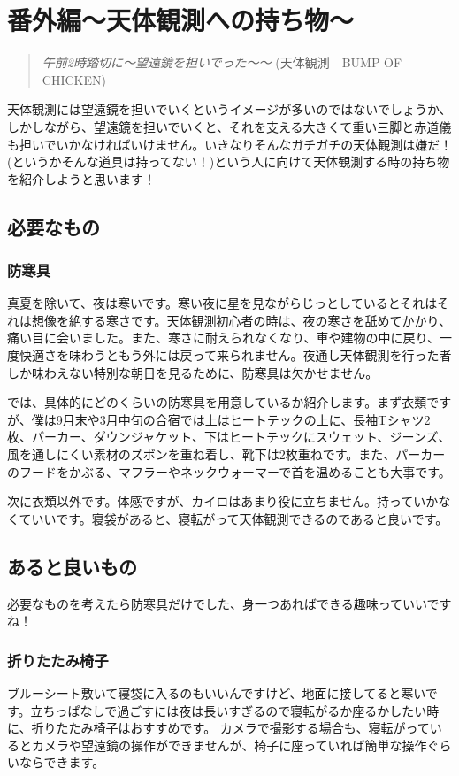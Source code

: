 \documentclass[../main]{subfiles}
\begin{document}
\section{番外編〜天体観測への持ち物〜}
\begin{verse}
  {\slshape
  午前2時踏切に〜望遠鏡を担いでった〜〜
  }
  (天体観測　BUMP OF CHICKEN)
\end{verse}



天体観測には望遠鏡を担いでいくというイメージが多いのではないでしょうか、しかしながら、望遠鏡を担いでいくと、それを支える大きくて重い三脚と赤道儀も担いでいかなければいけません。いきなりそんなガチガチの天体観測は嫌だ！(というかそんな道具は持ってない！)という人に向けて天体観測する時の持ち物を紹介しようと思います！

\subsection{必要なもの}
\subsubsection{防寒具}
真夏を除いて、夜は寒いです。寒い夜に星を見ながらじっとしているとそれはそれは想像を絶する寒さです。天体観測初心者の時は、夜の寒さを舐めてかかり、痛い目に会いました。また、寒さに耐えられなくなり、車や建物の中に戻り、一度快適さを味わうともう外には戻って来られません。夜通し天体観測を行った者しか味わえない特別な朝日を見るために、防寒具は欠かせません。

では、具体的にどのくらいの防寒具を用意しているか紹介します。まず衣類ですが、僕は9月末や3月中旬の合宿では上はヒートテックの上に、長袖Tシャツ2枚、パーカー、ダウンジャケット、下はヒートテックにスウェット、ジーンズ、風を通しにくい素材のズボンを重ね着し、靴下は2枚重ねです。また、パーカーのフードをかぶる、マフラーやネックウォーマーで首を温めることも大事です。

次に衣類以外です。体感ですが、カイロはあまり役に立ちません。持っていかなくていいです。寝袋があると、寝転がって天体観測できるのであると良いです。

\subsection{あると良いもの}
必要なものを考えたら防寒具だけでした、身一つあればできる趣味っていいですね！

\subsubsection{折りたたみ椅子}
ブルーシート敷いて寝袋に入るのもいいんですけど、地面に接してると寒いです。立ちっぱなしで過ごすには夜は長いすぎるので寝転がるか座るかしたい時に、折りたたみ椅子はおすすめです。
カメラで撮影する場合も、寝転がっているとカメラや望遠鏡の操作ができませんが、椅子に座っていれば簡単な操作ぐらいならできます。
\end{document}
